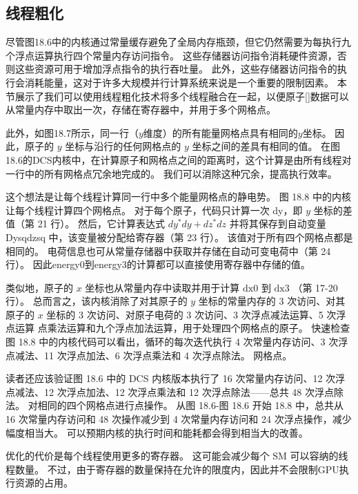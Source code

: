 \subsection{线程粗化}
尽管图18.6中的内核通过常量缓存避免了全局内存瓶颈，但它仍然需要为每执行九个浮点运算执行四个常量内存访问指令。 这些存储器访问指令消耗硬件资源，否则这些资源可用于增加浮点指令的执行吞吐量。 此外，这些存储器访问指令的执行会消耗能量，这对于许多大规模并行计算系统来说是一个重要的限制因素。 本节展示了我们可以使用线程粗化技术将多个线程融合在一起，以便原子[]数据可以从常量内存中取出一次，存储在寄存器中，并用于多个网格点。

此外，如图18.7所示，同一行（$y$维度）的所有能量网格点具有相同的$y$坐标。 因此，原子的 $y$ 坐标与沿行的任何网格点的 $y$ 坐标之间的差具有相同的值。 在图18.6的DCS内核中，在计算原子和网格点之间的距离时，这个计算是由所有线程对一行中的所有网格点冗余地完成的。 我们可以消除这种冗余，提高执行效率。

这个想法是让每个线程计算同一行中多个能量网格点的静电势。 图 18.8 中的内核让每个线程计算四个网格点。 对于每个原子，代码只计算一次 dy，即 $y$ 坐标的差值（第 21 行）。 然后，它计算表达式 $d y^{*} d y+d z^{*} d z$ 并将其保存到自动变量 Dysqdzsq 中，该变量被分配给寄存器（第 23 行）。 该值对于所有四个网格点都是相同的。 电荷信息也可从常量存储器中获取并存储在自动可变电荷中（第 24 行）。 因此energy0到energy3的计算都可以直接使用寄存器中存储的值。

类似地，原子的 $x$ 坐标也从常量内存中读取并用于计算 $\mathrm{dx} 0$ 到 $\mathrm{dx} 3$ （第 17-20 行）。 总而言之，该内核消除了对其原子的 $y$ 坐标的常量内存的 3 次访问、对其原子的 $x$ 坐标的 3 次访问、对原子电荷的 3 次访问、3 次浮点减法运算、5 次浮点运算 点乘法运算和九个浮点加法运算，用于处理四个网格点的原子。 快速检查图 18.8 中的内核代码可以看出，循环的每次迭代执行 4 次常量内存访问、3 次浮点减法、11 次浮点加法、6 次浮点乘法和 4 次浮点除法。 网格点。

读者还应该验证图 18.6 中的 DCS 内核版本执行了 16 次常量内存访问、12 次浮点减法、12 次浮点加法、12 次浮点乘法和 12 次浮点除法——总共 48 次浮点除法。 对相同的四个网格点进行点操作。 从图 18.6-图 18.6 开始 18.8 中，总共从 16 次常量内存访问和 48 次操作减少到 4 次常量内存访问和 24 次浮点操作，减少幅度相当大。 可以预期内核的执行时间和能耗都会得到相当大的改善。

优化的代价是每个线程使用更多的寄存器。 这可能会减少每个 SM 可以容纳的线程数量。 不过，由于寄存器的数量保持在允许的限度内，因此并不会限制GPU执行资源的占用。

